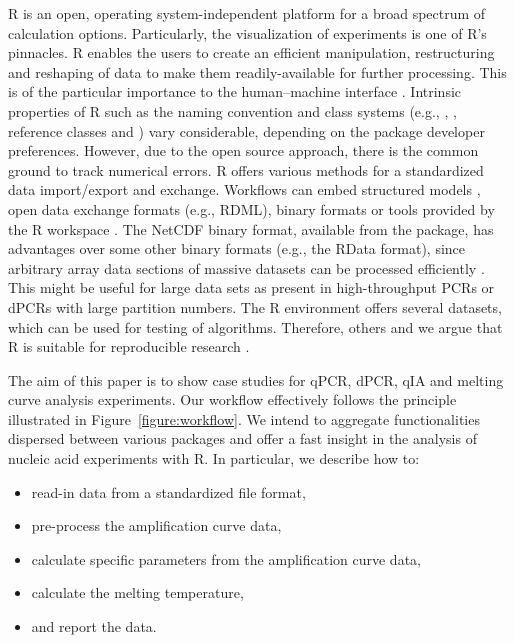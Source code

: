 R is an open, operating system-independent platform for a broad spectrum of 
calculation options. Particularly, the visualization of experiments is one of 
R's pinnacles. R enables the users to create an efficient manipulation, 
restructuring and reshaping of data to make them readily-available for further 
processing. This is of the particular importance to the human--machine interface 
\citep{Oh_2014}. Intrinsic properties of R such as the naming convention 
\citep{Baaaath_2012} and class systems (e.g., , , 
reference classes and ) vary considerable, depending on the package 
developer preferences. However, due to the open source approach, there is the 
common ground to track numerical errors. R offers various methods for a 
standardized data import/export and exchange. Workflows can embed structured 
models \citet{Guazzelli_2009}, open data exchange formats (e.g., RDML), binary 
formats \citep{michna_2013} or tools provided by the R workspace 
\citep{RDCT2010c}. The NetCDF binary format, available from the 
 package, has advantages over some other binary formats (e.g., 
the RData format), since arbitrary array data sections of massive datasets can 
be processed efficiently \citep{michna_2013}. This might be useful for large 
data sets as present in high-throughput PCRs or dPCRs with large partition 
numbers. The R environment offers several datasets, which can be used for 
testing of algorithms. Therefore, others and we argue that R is suitable for 
reproducible research \citep{Murrell_2012, gandrud_2013, hofmann_2013, 
kuhn_cran_2014, Leeper_2014, liu_2014}.

The aim of this paper is to show case studies for qPCR, dPCR, qIA and melting 
curve analysis experiments. Our workflow effectively follows the principle 
illustrated in Figure~\ref{figure:workflow}. We intend to aggregate 
functionalities dispersed between various packages and offer a fast insight in 
the analysis of nucleic acid experiments with R. In particular, we describe how 
to:

\begin{itemize}
 \item read-in data from a standardized file format,
 \item pre-process the amplification curve data,
 \item calculate specific parameters from the amplification curve data,
 \item calculate the melting temperature,
 \item and report the data.
\end{itemize}

